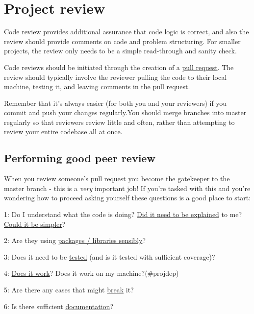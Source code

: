 \documentclass[]{book}
\begin{document}
\hypertarget{review}{%
\section{Project review}\label{review}}

Code review provides additional assurance that code logic is correct, and also the review should provide comments on code and problem structuring. For smaller projects, the review only needs to be a simple read-through and sanity check.

Code reviews should be initiated through the creation of a \protect\hyperlink{flow}{pull request}. The review should typically involve the reviewer pulling the code to their local machine, testing it, and leaving comments in the pull request.

Remember that it's always easier (for both you and your reviewers) if you commit and push your changes regularly.You should merge branches into master regularly so that reviewers review little and often, rather than attempting to review your entire codebase all at once.

\hypertarget{performing-good-peer-review}{%
\subsection*{Performing good peer review}\label{performing-good-peer-review}}

When you review someone's pull request you become the gatekeeper to the master branch - this is a \emph{very} important job! If you're tasked with this and you're wondering how to proceed asking yourself these questions is a good place to start:

1: Do I understand what the code is doing? \protect\hyperlink{ccc}{Did it need to be explained} to me? \protect\hyperlink{ccc}{Could it be simpler}?

2: Are they using \protect\hyperlink{defaults}{packages / libraries sensibly}?

3: Does it need to be \protect\hyperlink{unittest}{tested} (and is it tested with sufficient coverage)?

4: \protect\hyperlink{ccc}{Does it work}? Does it work on my machine?(\#projdep)

5: Are there any cases that might \protect\hyperlink{unittest}{break} it?

6: Is there sufficient \protect\hyperlink{readme}{documentation}?
\end{document}
